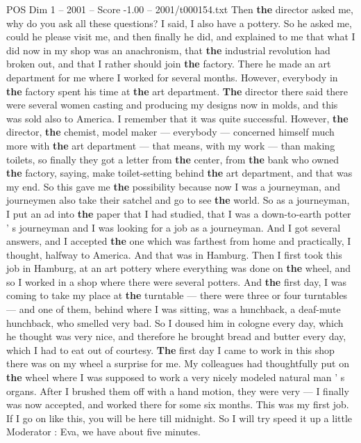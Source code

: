 \begin{textsample}{POS Dim 1 – 2001 – Score -1.00 – 2001/t000154.txt}
Then \textbf{the} director asked me, why do you ask all these questions?
I said, I also have a pottery.
So he asked me, could he please visit me, and then finally he did, and explained to me that what I did now in my shop was an anachronism, that \textbf{the} industrial revolution had broken out, and that I rather should join \textbf{the} factory.
There he made an art department for me where I worked for several months.
However, everybody in \textbf{the} factory spent his time at \textbf{the} art department. \textbf{The} director there said there were several women casting and producing my designs now in molds, and this was sold also to America.
I remember that it was quite successful.
However, \textbf{the} director, \textbf{the} chemist, model maker — everybody — concerned himself much more with \textbf{the} art department — that means, with my work — than making toilets, so finally they got a letter from \textbf{the} center, from \textbf{the} bank who owned \textbf{the} factory, saying, make toilet-setting behind \textbf{the} art department, and that was my end.
So this gave me \textbf{the} possibility because now I was a journeyman, and journeymen also take their satchel and go to see \textbf{the} world.
So as a journeyman, I put an ad into \textbf{the} paper that I had studied, that I was a down-to-earth potter ' s journeyman and I was looking for a job as a journeyman.
And I got several answers, and I accepted \textbf{the} one which was farthest from home and practically, I thought, halfway to America.
And that was in Hamburg.
Then I first took this job in Hamburg, at an art pottery where everything was done on \textbf{the} wheel, and so I worked in a shop where there were several potters.
And \textbf{the} first day, I was coming to take my place at \textbf{the} turntable — there were three or four turntables — and one of them, behind where I was sitting, was a hunchback, a deaf-mute hunchback, who smelled very bad.
So I doused him in cologne every day, which he thought was very nice, and therefore he brought bread and butter every day, which I had to eat out of courtesy. \textbf{The} first day I came to work in this shop there was on my wheel a surprise for me.
My colleagues had thoughtfully put on \textbf{the} wheel where I was supposed to work a very nicely modeled natural man ' s organs.
After I brushed them off with a hand motion, they were very — I finally was now accepted, and worked there for some six months.
This was my first job.
If I go on like this, you will be here till midnight.
So I will try speed it up a little Moderator : Eva, we have about five minutes.

\end{textsample}
